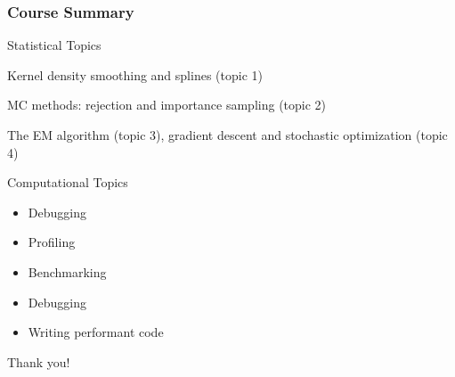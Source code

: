 \documentclass[aspectratio=1610,onlytextwidth]{beamer}
\begin{document}
\begin{frame}[c]
  \frametitle{Course Summary}

  \begin{block}{Statistical Topics}
    \begin{description}[<+->][Optimization]
      \item[Smoothing] Kernel density smoothing and splines (topic 1)
      \item[Simulation] MC methods: rejection and importance sampling (topic 2)
      \item[Optimization] The EM algorithm (topic 3), gradient descent and stochastic optimization (topic 4)
    \end{description}
  \end{block}

  \pause

  \begin{block}{Computational Topics}
    \begin{itemize}
      \item Debugging
      \item Profiling
      \item Benchmarking
      \item Debugging
      \item Writing performant code
    \end{itemize}
  \end{block}
\end{frame}

\begin{frame}[standout]
  Thank you!
\end{frame}


\end{document}
